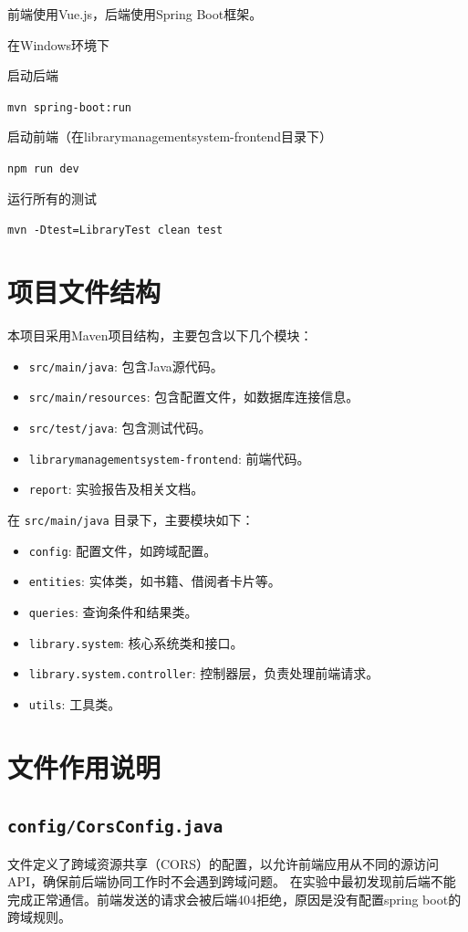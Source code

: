\documentclass{ctexart}
\begin{document}
前端使用Vue.js，后端使用Spring Boot框架。

在Windows环境下

启动后端

\texttt{mvn spring-boot:run}

启动前端（在librarymanagementsystem-frontend目录下）

\texttt{npm run dev}

运行所有的测试

\texttt{mvn -Dtest=LibraryTest clean test}
\section{项目文件结构}

本项目采用Maven项目结构，主要包含以下几个模块：

\begin{itemize}
    \item \texttt{src/main/java}: 包含Java源代码。
    \item \texttt{src/main/resources}: 包含配置文件，如数据库连接信息。
    \item \texttt{src/test/java}: 包含测试代码。
    \item \texttt{librarymanagementsystem-frontend}: 前端代码。
    \item \texttt{report}: 实验报告及相关文档。
\end{itemize}

在 \texttt{src/main/java} 目录下，主要模块如下：

\begin{itemize}
    \item \texttt{config}: 配置文件，如跨域配置。
    \item \texttt{entities}: 实体类，如书籍、借阅者卡片等。
    \item \texttt{queries}: 查询条件和结果类。
    \item \texttt{library.system}: 核心系统类和接口。
    \item \texttt{library.system.controller}: 控制器层，负责处理前端请求。
    \item \texttt{utils}: 工具类。
\end{itemize}

\section{文件作用说明}

\subsection{\texttt{config/CorsConfig.java}}
文件定义了跨域资源共享（CORS）的配置，以允许前端应用从不同的源访问API，确保前后端协同工作时不会遇到跨域问题。
在实验中最初发现前后端不能完成正常通信。前端发送的请求会被后端404拒绝，原因是没有配置spring boot的跨域规则。
\end{document}

